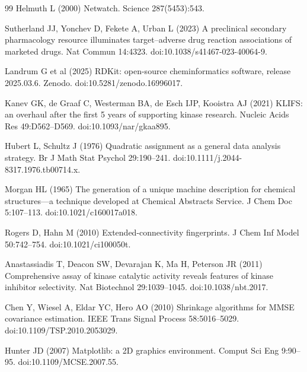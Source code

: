 \begin{thebibliography}{99}
 Helmuth L (2000) Netwatch. Science 287(5453):543.

 Sutherland JJ, Yonchev D, Fekete A, Urban L (2023) A preclinical
secondary pharmacology resource illuminates target--adverse drug reaction associations of
marketed drugs. Nat Commun 14:4323. doi:10.1038/s41467-023-40064-9.

 Landrum G et al (2025) RDKit: open-source cheminformatics
software, release 2025.03.6. Zenodo. doi:10.5281/zenodo.16996017.

 Kanev GK, de Graaf C, Westerman BA, de Esch IJP, Kooistra AJ (2021) KLIFS:
an overhaul after the first 5 years of supporting kinase research. Nucleic Acids Res
49:D562--D569. doi:10.1093/nar/gkaa895.

 Hubert L, Schultz J (1976) Quadratic assignment as a
general data analysis strategy. Br J Math Stat Psychol 29:190--241.
doi:10.1111/j.2044-8317.1976.tb00714.x.

 Morgan HL (1965) The generation of a unique machine
description for chemical structures---a technique developed at Chemical
Abstracts Service. J Chem Doc 5:107--113. doi:10.1021/c160017a018.

 Rogers D, Hahn M (2010) Extended-connectivity fingerprints.
J Chem Inf Model 50:742--754. doi:10.1021/ci100050t.

 Anastassiadis T, Deacon SW, Devarajan K,
Ma H, Peterson JR (2011) Comprehensive assay of kinase catalytic activity
reveals features of kinase inhibitor selectivity. Nat Biotechnol 29:1039--1045.
doi:10.1038/nbt.2017.

 Chen Y, Wiesel A, Eldar YC, Hero AO (2010) Shrinkage
algorithms for MMSE covariance estimation. IEEE Trans Signal Process
58:5016--5029. doi:10.1109/TSP.2010.2053029.

 Hunter JD (2007) Matplotlib: a 2D graphics environment.
Comput Sci Eng 9:90--95. doi:10.1109/MCSE.2007.55.

\end{thebibliography}

